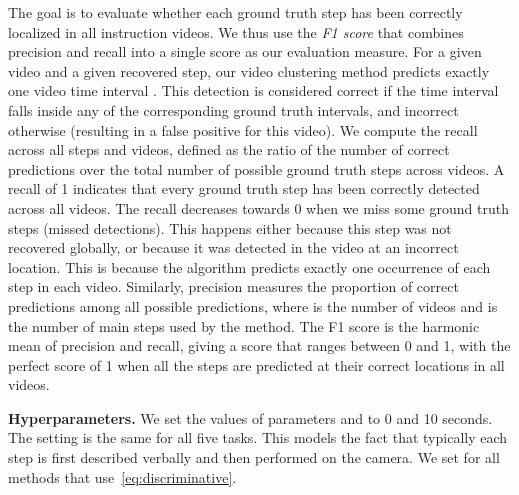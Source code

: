 \documentclass[10pt,twocolumn,letterpaper]{article}
\begin{document}
The goal is to evaluate whether each ground truth step has been correctly localized in all instruction videos. We thus use the \emph{F1 score} that combines precision and recall into a single score as our evaluation measure. 
For a given video and a given recovered step, our video clustering method predicts exactly one video time interval . 
This detection is considered correct if the time interval falls inside any of the corresponding ground truth intervals, and incorrect otherwise (resulting in a false positive for this video). 
We compute the recall across all steps and videos, defined as the ratio of the number of correct predictions over the total number of possible ground truth steps across videos. A recall of 1 indicates that every ground truth step has been correctly detected across all videos. 
The recall decreases towards 0 when we miss some ground truth steps (missed detections). 
This happens either because this step was not recovered globally, or because it was detected in the video at an incorrect location. This is because the algorithm predicts exactly one occurrence of each step in each video. Similarly, precision measures the proportion of correct predictions among all    possible predictions, where  is the number of videos and 
is the number of main steps used by the method. The F1 score is the harmonic mean of precision and recall, giving a score that ranges between 0 and 1, with the perfect score of 1 when all the steps are predicted at their correct locations in all videos.  

\textbf{Hyperparameters.} 
We set the values of parameters  and  to 0 and 10 seconds. The setting is the same for all five tasks.
This models the fact that typically each step is first described verbally and then performed on the camera.
We set  for all methods that use~\eqref{eq:discriminative}.
\end{document}
